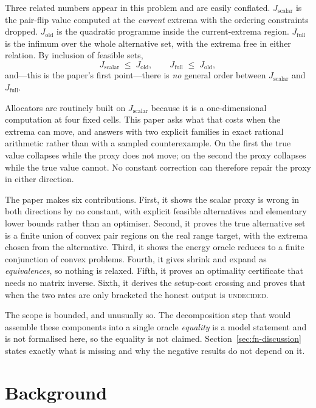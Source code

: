 Three related numbers appear in this problem and are easily conflated.
$J_{\mathrm{scalar}}$ is the pair-flip value computed at the \emph{current} extrema with the
ordering constraints dropped. $J_{\mathrm{old}}$ is the quadratic programme inside the
current-extrema region. $J_{\mathrm{full}}$ is the infimum over the whole alternative set,
with the extrema free in either relation. By inclusion of feasible sets,
\begin{equation}
J_{\mathrm{scalar}}\;\leq\;J_{\mathrm{old}},
\qquad
J_{\mathrm{full}}\;\leq\;J_{\mathrm{old}},
\label{eq:fn-order}
\end{equation}
and---this is the paper's first point---there is \emph{no} general order between
$J_{\mathrm{scalar}}$ and $J_{\mathrm{full}}$.

Allocators are routinely built on $J_{\mathrm{scalar}}$ because it is a one-dimensional
computation at four fixed cells. This paper asks what that costs when the extrema can move,
and answers with two explicit families in exact rational arithmetic rather than with a
sampled counterexample. On the first the true value collapses while the proxy does not move;
on the second the proxy collapses while the true value cannot. No constant correction can
therefore repair the proxy in either direction.

The paper makes six contributions. First, it shows the scalar proxy is wrong in both
directions by no constant, with explicit feasible alternatives and elementary lower bounds
rather than an optimiser. Second, it proves the true alternative set is a finite union of
convex pair regions on the real range target, with the extrema chosen from the alternative.
Third, it shows the energy oracle reduces to a finite conjunction of convex problems. Fourth,
it gives shrink and expand as \emph{equivalences}, so nothing is relaxed. Fifth, it proves an
optimality certificate that needs no matrix inverse. Sixth, it derives the setup-cost
crossing and proves that when the two rates are only bracketed the honest output is
\textsc{undecided}.

The scope is bounded, and unusually so. The decomposition step that would assemble these
components into a single oracle \emph{equality} is a model statement and is not formalised
here, so the equality is not claimed. Section~\ref{sec:fn-discussion} states exactly what is
missing and why the negative results do not depend on it.


\section{Background}

